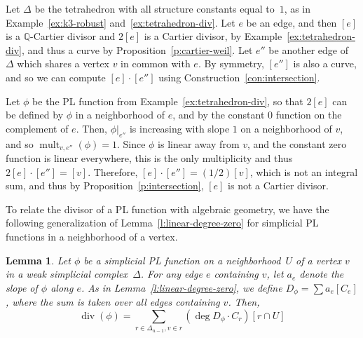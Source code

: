 \documentclass[11pt,reqno]{amsart}
\newtheorem{lem}[thm]{Lemma}
\theoremstyle{definition}
\renewcommand{\div}{\operatorname{div}}
\newcommand{\mult}{\operatorname{mult}}
\newcommand{\QQ}{\mathbb Q}
\begin{document}
\begin{ex}\label{ex:k3-intersection}
Let $\Delta$ be the tetrahedron with all structure constants equal to~$1$, as in
Example~\ref{ex:k3-robust} and~\ref{ex:tetrahedron-div}. Let $e$ be an edge, and
then $[e]$ is a $\QQ$-Cartier divisor and $2[e]$ is a Cartier divisor, by
Example~\ref{ex:tetrahedron-div}, and thus a curve by
Proposition~\ref{p:cartier-weil}. Let $e''$ be another edge of $\Delta$ which
shares a vertex $v$ in common with $e$. By symmetry, $[e'']$ is also a curve,
and so we can compute $[e] \cdot [e'']$ using
Construction~\ref{con:intersection}.

Let $\phi$ be the PL function from Example~\ref{ex:tetrahedron-div}, so that
$2[e]$ can be defined by $\phi$ in a neighborhood of $e$, and by the constant
$0$ function on the complement of $e$. Then, $\phi \vert_{e''}$ is increasing
with slope $1$ on a neighborhood of $v$, and so $\mult_{v,e''}(\phi) =1$.
Since $\phi$ is linear away from $v$, and the constant zero function is linear
everywhere, this is the only multiplicity and thus
$2[e] \cdot [e''] = [v]$.
Therefore, $[e] \cdot [e''] = (1/2)[v]$, which is not an integral sum, and thus by
Proposition~\ref{p:intersection}, $[e]$ is not a Cartier divisor.
\end{ex}


To relate the divisor of a PL function with algebraic geometry, we have the
following generalization of Lemma~\ref{l:linear-degree-zero} for simplicial PL
functions in a neighborhood of a vertex.

\begin{lem}\label{l:divisor-intersection}
Let $\phi$ be a simplicial PL function on a neighborhood~$U$ of a vertex $v$ in a
weak simplicial complex~$\Delta$. For any edge $e$ containing $v$, let $a_e$
denote the slope of $\phi$ along $e$. As in Lemma~\ref{l:linear-degree-zero}, we
define $D_\phi = \sum a_{e} [C_e]$, where the sum is taken over all edges
containing $v$. Then,
\begin{equation*}
\div(\phi) =
\sum_{r \in \Delta_{n-1}, v \in r} (\deg D_\phi \cdot C_r) [r \cap U]
\end{equation*}
\end{lem}
\end{document}
